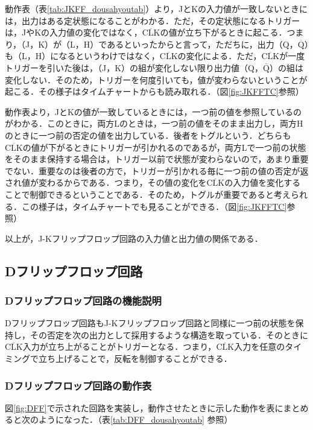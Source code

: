 動作表（表\ref{tab:JKFF_dousahyoutab}）より，JとKの入力値が一致しないときには，出力はある定状態になることがわかる．ただ，その定状態になるトリガーは，JやKの入力値の変化ではなく，$\overline{\mathrm{CLK}}$の値が立ち下がるときに起こる．つまり，（J，K）が（L，H）であるといったからと言って，ただちに，出力（Q，$\overline{\mathrm{Q}}$）も（L，H）になるというわけではなく，$\overline{\mathrm{CLK}}$の変化による．ただ，$\overline{\mathrm{CLK}}$が一度トリガーを引いた後は，（J，K）の組が変化しない限り出力値（Q，$\overline{\mathrm{Q}}$）の組は変化しない．そのため，トリガーを何度引いても，値が変わらないということが起こる．その様子はタイムチャートからも読み取れる．（図\ref{fig:JKFFTC}参照）

動作表より，JとKの値が一致しているときには，一つ前の値を参照しているのがわかる．このときに，両方Lのときは，一つ前の値をそのまま出力し，両方Hのときに一つ前の否定の値を出力している．後者をトグルという．どちらも$\overline{\mathrm{CLK}}$の値が下がるときにトリガーが引かれるのであるが，両方Lで一つ前の状態をそのまま保持する場合は，トリガー以前で状態が変わらないので，あまり重要でない．重要なのは後者の方で，トリガーが引かれる毎に一つ前の値の否定が返され値が変わるからである．つまり，その値の変化を$\overline{\mathrm{CLK}}$の入力値を変化することで制御できるということである．そのため，トグルが重要であると考えられる．この様子は，タイムチャートでも見ることができる．（図\ref{fig:JKFFTC}参照）
\\
\par
以上が，J-Kフリップフロップ回路の入力値と出力値の関係である．

%
%
\subsection{Dフリップフロップ回路}
\label{experiment_Dflipflop}

%
%
\subsubsection{Dフリップフロップ回路の機能説明}
\label{DFF_explain}
Dフリップフロップ回路もJ-Kフリップフロップ回路と同様に一つ前の状態を保持し，その否定を次の出力として採用するような構造を取っている．そのときに$\overline{\mathrm{CLK}}$入力が立ち上がることがトリガーとなる．つまり，$\overline{\mathrm{CLK}}$入力を任意のタイミングで立ち上げることで，反転を制御することができる．

%
%
\subsubsection{Dフリップフロップ回路の動作表}
\label{DFF_dousahyou}
図\ref{fig:DFF}で示された回路を実装し，動作させたときに示した動作を表にまとめると次のようになった．（表\ref{tab:DFF_dousahyoutab} 参照）

